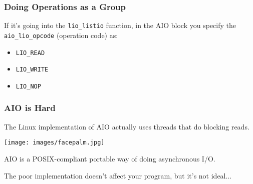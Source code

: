 \begin{frame}
	\frametitle{Doing Operations as a Group}

	If it's going into the \texttt{lio\_listio} function, in the AIO block you specify the \texttt{aio\_lio\_opcode} (operation code) as:

	\begin{itemize}
		\item \texttt{LIO\_READ}
		\item \texttt{LIO\_WRITE}
		\item \texttt{LIO\_NOP}
	\end{itemize}

\end{frame}

\begin{frame}
	\frametitle{AIO is Hard}
	The Linux implementation of AIO actually uses threads that do blocking reads.

	\begin{center}
		\texttt{[image: images/facepalm.jpg]}
	\end{center}

	AIO is a POSIX-compliant portable way of doing asynchronous I/O.

	The poor implementation doesn't affect your program, but it's not ideal...

\end{frame}





